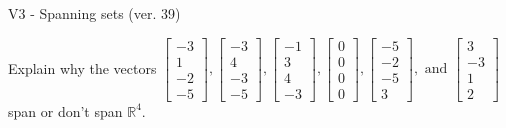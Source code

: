 \begin{exercise}
  \begin{exerciseTitle}V3 - Spanning sets (ver. 39)\end{exerciseTitle}
  \begin{exerciseStatement}
    Explain why the vectors \(\left[\begin{array}{r}
-3 \\
1 \\
-2 \\
-5
\end{array}\right] , \left[\begin{array}{r}
-3 \\
4 \\
-3 \\
-5
\end{array}\right] , \left[\begin{array}{r}
-1 \\
3 \\
4 \\
-3
\end{array}\right] , \left[\begin{array}{r}
0 \\
0 \\
0 \\
0
\end{array}\right] , \left[\begin{array}{r}
-5 \\
-2 \\
-5 \\
3
\end{array}\right] , \text{ and } \left[\begin{array}{r}
3 \\
-3 \\
1 \\
2
\end{array}\right]\) span or don't span \(\mathbb{R}^4\). 
	



\end{exerciseStatement}
\end{exercise}
